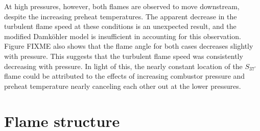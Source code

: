 At high pressures, however, both flames are observed to move downstream, despite the increasing preheat temperatures.
The apparent decrease in the turbulent flame speed at these conditions is an unexpected result, and the modified Damk\"ohler model is insufficient in accounting for this observation.
Figure FIXME also shows that the flame angle for both cases decreases slightly with pressure.
This suggests that the turbulent flame speed was consistently decreasing with pressure.
In light of this, the nearly constant location of the \(S_{37^\circ}\) flame could be attributed to the effects of increasing combustor pressure and preheat temperature nearly canceling each other out at the lower pressures.



\section{Flame structure}


